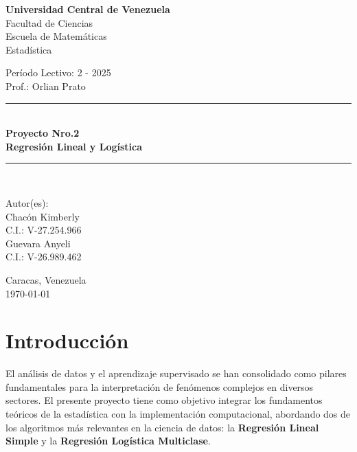 \documentclass[12pt,a4paper]{article}
\begin{document}
	
	\begin{titlepage}
		\centering
		
		\vspace*{1cm}
		
		{\Large\textbf{Universidad Central de Venezuela}}\\[0.3cm]
		{\large Facultad de Ciencias}\\[0.2cm]
		{\large Escuela de Matemáticas}\\[0.2cm]
		{\large Estadística}\\[0.5cm]
		
		\vspace{1cm}
		
		{\large Período Lectivo: 2 - 2025}\\[0.3cm]
		{\large Prof.: Orlian Prato}\\[2cm]
		
		\rule{\linewidth}{0.5mm}\\[0.4cm]
		{\huge\bfseries Proyecto Nro.2}\\[0.2cm]
		{\Large\bfseries Regresión Lineal y Logística}\\[0.4cm]
		\rule{\linewidth}{0.5mm}\\[0.2cm]
		
		\vfill
		
		{\large Autor(es):}\\[0.3cm]
		{\large Chacón Kimberly}\\
		{\large C.I.: V-27.254.966}\\[0.1cm]
		{\large Guevara Anyeli}\\
		{\large C.I.: V-26.989.462}\\[2cm]
		\vfill
		
		{\large Caracas, Venezuela}\\
		{\large \today}
		
	\end{titlepage}
	
\newpage
\section*{\centering Introducción}

El análisis de datos y el aprendizaje supervisado se han consolidado como pilares fundamentales para la interpretación de fenómenos complejos en diversos sectores. El presente proyecto tiene como objetivo integrar los fundamentos teóricos de la estadística con la implementación computacional, abordando dos de los algoritmos más relevantes en la ciencia de datos: la \textbf{Regresión Lineal Simple} y la \textbf{Regresión Logística Multiclase}.
\end{document}
